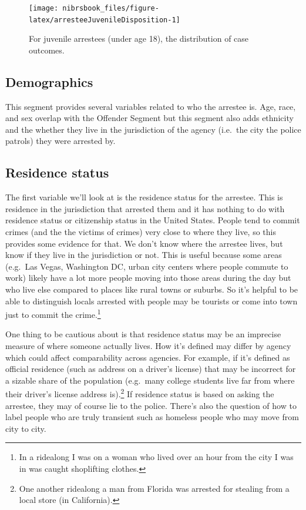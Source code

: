 \documentclass[
  12pt,
  openany]{book}
\begin{document}
\begin{figure}

{\centering \texttt{[image: nibrsbook\_files/figure-latex/arresteeJuvenileDisposition-1]} 

}

\caption{For juvenile arrestees (under age 18), the distribution of case outcomes.}\label{fig:arresteeJuvenileDisposition}
\end{figure}

\hypertarget{demographics-2}{%
\subsection{Demographics}\label{demographics-2}}

This segment provides several variables related to who the arrestee is. Age, race, and sex overlap with the Offender Segment but this segment also adds ethnicity and the whether they live in the jurisdiction of the agency (i.e.~the city the police patrols) they were arrested by.

\hypertarget{residence-status-1}{%
\subsection{Residence status}\label{residence-status-1}}

The first variable we'll look at is the residence status for the arrestee. This is residence in the jurisdiction that arrested them and it has nothing to do with residence status or citizenship status in the United States. People tend to commit crimes (and the the victims of crimes) very close to where they live, so this provides some evidence for that. We don't know where the arrestee lives, but know if they live in the jurisdiction or not. This is useful because some areas (e.g.~Las Vegas, Washington DC, urban city centers where people commute to work) likely have a lot more people moving into those areas during the day but who live else compared to places like rural towns or suburbs. So it's helpful to be able to distinguish locals arrested with people may be tourists or come into town just to commit the crime.\footnote{In a ridealong I was on a woman who lived over an hour from the city I was in was caught shoplifting clothes.}

One thing to be cautious about is that residence status may be an imprecise measure of where someone actually lives. How it's defined may differ by agency which could affect comparability across agencies. For example, if it's defined as official residence (such as address on a driver's license) that may be incorrect for a sizable share of the population (e.g.~many college students live far from where their driver's license address is).\footnote{One another ridealong a man from Florida was arrested for stealing from a local store (in California).} If residence status is based on asking the arrestee, they may of course lie to the police. There's also the question of how to label people who are truly transient such as homeless people who may move from city to city.
\end{document}

